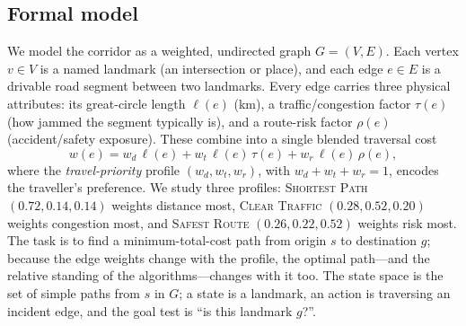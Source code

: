 \documentclass[10pt]{article}
\begin{document}
\subsection{Formal model}
We model the corridor as a weighted, undirected graph $G=(V,E)$. Each vertex
$v\in V$ is a named landmark (an intersection or place), and each edge
$e\in E$ is a drivable road segment between two landmarks. Every edge carries
three physical attributes: its great-circle length $\ell(e)$ (km), a
traffic/congestion factor $\tau(e)$ (how jammed the segment typically is), and a
route-risk factor $\rho(e)$ (accident/safety exposure). These combine into a
single blended traversal cost
\begin{equation}
w(e) = w_d\,\ell(e) + w_t\,\ell(e)\,\tau(e) + w_r\,\ell(e)\,\rho(e),
\end{equation}
where the \emph{travel-priority} profile $(w_d,w_t,w_r)$, with
$w_d+w_t+w_r=1$, encodes the traveller's preference. We study three profiles:
\textsc{Shortest Path} $(0.72,0.14,0.14)$ weights distance most,
\textsc{Clear Traffic} $(0.28,0.52,0.20)$ weights congestion most, and
\textsc{Safest Route} $(0.26,0.22,0.52)$ weights risk most. The task is to find a
minimum-total-cost path from origin $s$ to destination $g$; because the edge
weights change with the profile, the optimal path---and the relative standing of
the algorithms---changes with it too. The state space is the set of simple paths
from $s$ in $G$; a state is a landmark, an action is traversing an incident edge,
and the goal test is ``is this landmark $g$?''.
\end{document}
